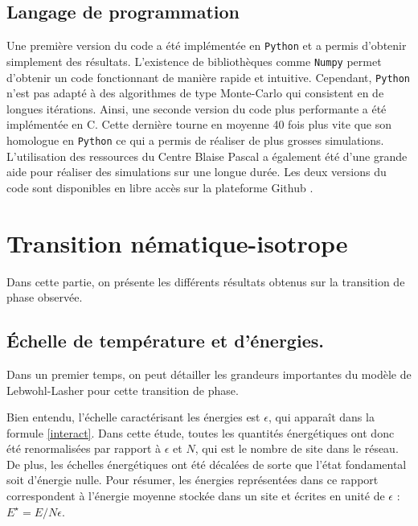\documentclass[11pt,a4paper]{article}
\numberwithin{equation}{section}
\newcommand{\CC}{C\nolinebreak\hspace{-.05em}\raisebox{.4ex}{\tiny\bf +}\nolinebreak\hspace{-.10em}\raisebox{.4ex}{\tiny\bf +}}
\def\CC{{C\nolinebreak[4]\hspace{-.05em}\raisebox{.4ex}{\tiny\bf ++}}}
\begin{document}
\subsection{Langage de programmation}
Une première version du code a été implémentée en \texttt{Python} et a permis d'obtenir simplement des résultats. L'existence de bibliothèques comme \texttt{Numpy} permet d'obtenir un code fonctionnant de manière rapide et intuitive. Cependant, \texttt{Python} n'est pas adapté à des algorithmes de type Monte-Carlo qui consistent en de longues itérations. Ainsi, une seconde version du code plus performante a été implémentée en \CC. Cette dernière tourne en moyenne 40 fois plus vite que son homologue en \texttt{Python} ce qui a permis de réaliser de plus grosses simulations. L'utilisation des ressources du Centre Blaise Pascal a également été d'une grande aide pour réaliser des simulations sur une longue durée. Les deux versions du code sont disponibles en libre accès sur la plateforme Github \cite{github}.
\newpage
\section{Transition nématique-isotrope}
Dans cette partie, on présente les différents résultats obtenus sur la transition de phase observée. 
\subsection{Échelle de température et d'énergies.}
\label{scale}
Dans un premier temps, on peut détailler les grandeurs importantes du modèle de Lebwohl-Lasher pour cette transition de phase.
\medskip

Bien entendu, l'échelle caractérisant les énergies est $\epsilon$, qui apparaît dans la formule \ref{interact}. Dans cette étude, toutes les quantités énergétiques ont donc été renormalisées par rapport à $\epsilon$ et $N$, qui est le nombre de site dans le réseau. De plus, les échelles énergétiques ont été décalées de sorte que l'état fondamental soit d'énergie nulle. Pour résumer, les énergies représentées dans ce rapport correspondent à l'énergie moyenne stockée dans un site et écrites en unité de $\epsilon$ : $E^\star=E/N\epsilon$.
\medskip
\end{document}
